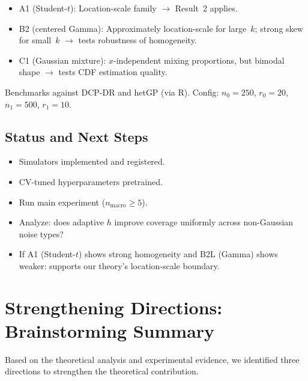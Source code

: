 \documentclass[11pt]{article}
\begin{document}
\begin{itemize}
  \item A1 (Student-$t$): Location-scale family $\to$ Result~2 applies.
  \item B2 (centered Gamma): Approximately location-scale for large~$k$;
    strong skew for small~$k$ $\to$ tests robustness of homogeneity.
  \item C1 (Gaussian mixture): $x$-independent mixing proportions, but
    bimodal shape $\to$ tests CDF estimation quality.
\end{itemize}

Benchmarks against DCP-DR and hetGP (via R). Config:
$n_0 = 250$, $r_0 = 20$, $n_1 = 500$, $r_1 = 10$.

\subsection{Status and Next Steps}

\begin{itemize}
  \item[$\checkmark$] Simulators implemented and registered.
  \item[$\checkmark$] CV-tuned hyperparameters pretrained.
  \item[$\square$] Run main experiment ($n_{\mathrm{macro}} \ge 5$).
  \item[$\square$] Analyze: does adaptive $h$ improve coverage
    uniformly across non-Gaussian noise types?
  \item[$\square$] If A1 (Student-$t$) shows strong homogeneity and
    B2L (Gamma) shows weaker: supports our theory's location-scale
    boundary.
\end{itemize}


\section{Strengthening Directions: Brainstorming Summary}
\label{sec:directions}

Based on the theoretical analysis and experimental evidence, we
identified three directions to strengthen the theoretical contribution.

\end{document}
